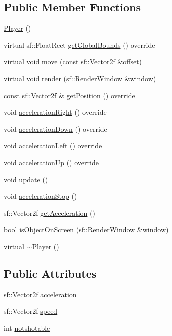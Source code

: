 \subsection*{Public Member Functions}
\begin{DoxyCompactItemize}
\item 
\hyperlink{class_player_affe0cc3cb714f6deb4e62f0c0d3f1fd8}{Player} ()
\item 
virtual sf\+::\+Float\+Rect \hyperlink{class_player_a04324f777f14ec311bc72399a368d24e}{get\+Global\+Bounds} () override
\item 
virtual void \hyperlink{class_player_aec7f6d54c177577609263dc1f31063b0}{move} (const sf\+::\+Vector2f \&offset)
\item 
virtual void \hyperlink{class_player_ad2172bbd6077d0f2ca16d215a86b5b60}{render} (sf\+::\+Render\+Window \&window)
\item 
const sf\+::\+Vector2f \& \hyperlink{class_player_a202e63e22c98a31b6070d6939ca6f793}{get\+Position} () override
\item 
void \hyperlink{class_player_a807f037c5102000aeb93a3e73bfe9952}{acceleration\+Right} () override
\item 
void \hyperlink{class_player_ab8ec47b1c74245dfe523999647b8cd4c}{acceleration\+Down} () override
\item 
void \hyperlink{class_player_a3d7d8283667bbbc2aa7b4ffe85f2a1c4}{acceleration\+Left} () override
\item 
void \hyperlink{class_player_aaf5e60d89a206c6287c1360f93f6a8b9}{acceleration\+Up} () override
\item 
void \hyperlink{class_player_a82c3476f3e65a4e2ac6bcd040771bdd4}{update} ()
\item 
void \hyperlink{class_player_a0dce6ea2c5edb142604fc128b2bd9840}{acceleration\+Stop} ()
\item 
sf\+::\+Vector2f \hyperlink{class_player_a8d04e73e10b26db769818e8d9167b3f3}{get\+Acceleration} ()
\item 
bool \hyperlink{class_player_ac2c0f9ac6f1d4908465a23f9ddb4cb1c}{is\+Object\+On\+Screen} (sf\+::\+Render\+Window \&window)
\item 
virtual \hyperlink{class_player_a749d2c00e1fe0f5c2746f7505a58c062}{$\sim$\+Player} ()
\end{DoxyCompactItemize}
\subsection*{Public Attributes}
\begin{DoxyCompactItemize}
\item 
sf\+::\+Vector2f \hyperlink{class_player_ae31035c38fbcf2684f34d7b792bbb93d}{acceleration}
\item 
sf\+::\+Vector2f \hyperlink{class_player_aac86a0c16c74e68268e6f37f1b21659f}{speed}
\item 
int \hyperlink{class_player_a170241ab79d607c2350bf81c6747ecd7}{notshotable}
\end{DoxyCompactItemize}
